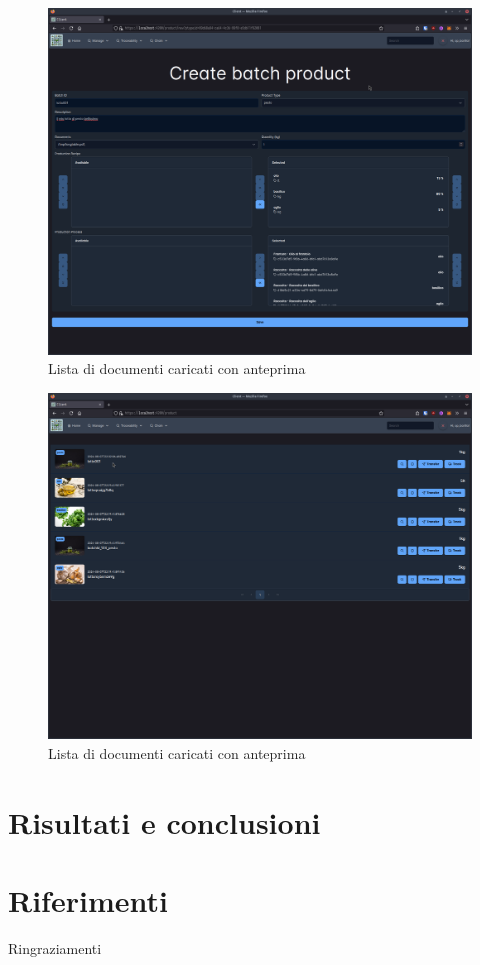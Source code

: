 \documentclass[a4paper,11pt]{article}
\begin{document}
\begin{figure}[H]
  \centering
  \includegraphics[width=0.5\linewidth]{screenIotChain/0012.png}
  \caption{Lista di documenti caricati con anteprima}
  \label{fig:screen12}
\end{figure}


\begin{figure}[H]
  \centering
  \includegraphics[width=0.5\linewidth]{screenIotChain/0013.png}
  \caption{Lista di documenti caricati con anteprima}
  \label{fig:screen13}
\end{figure}



\clearpage
\section{Risultati e conclusioni}

\clearpage
\section{Riferimenti}
\listoffigures
\clearpage
\listoftables
\clearpage
\renewcommand\listoflistingscaption{Elenco del codice sorgente}
\listoflistings %
\clearpage
\printbibliography
\clearpage
{}
\centering
\vspace*{\fill}
Ringraziamenti
\vspace*{\fill}
\end{document}
